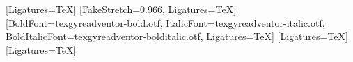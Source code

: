   {\newfontfamily{}[Ligatures=TeX]}
  {\newfontfamily{}[FakeStretch=0.966, Ligatures=TeX]}
\newfontfamily{}[BoldFont=texgyreadventor-bold.otf, ItalicFont=texgyreadventor-italic.otf, BoldItalicFont=texgyreadventor-bolditalic.otf, Ligatures=TeX]
\newfontfamily{}[Ligatures=TeX]
\newfontfamily{}[Ligatures=TeX]
\newfontfamily{}
\setmonofont{Liberation Mono}
\def\pptxbase{apt}
\def\pptxtitlef{apt}
\def\pptxtitlex{68.12}
\def\pptxtitley{84.48}
\def\pptxtitles{34}

